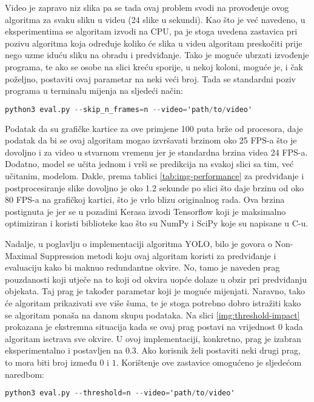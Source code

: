 Video je zapravo niz slika pa se tada ovaj problem svodi na provođenje ovog algoritma za svaku sliku u videu (24 slike u sekundi). Kao što je već navedeno, u eksperimentima se algoritam izvodi na CPU, pa je stoga uvedena zastavica pri pozivu algoritma koja određuje koliko će slika u videu algoritam preskočiti prije nego uzme iduću sliku na obradu i predviđanje. Tako je moguće ubrzati izvođenje programa, te ako se osobe na slici kreću sporije, u nekoj koloni, moguće je, i čak poželjno, postaviti ovaj parametar na neki veći broj. Tada se standardni poziv programa u terminalu mijenja na sljedeći način:
\begin{center}
\begin{lstlisting}[language=Awk, caption=Poziv programa sa opcijom preskakanja zadanog broja (n) slika u videu]
python3 eval.py --skip_n_frames=n --video='path/to/video'
\end{lstlisting}
\end{center}

Podatak da su grafičke kartice za ove primjene 100 puta brže od procesora, daje podatak da bi se ovaj algoritam mogao izvršavati brzinom oko 25 FPS-a što je dovoljno i za video u stvarnom vremenu jer je standardna brzina videa 24 FPS-a. Dodatno, model se učita jednom i vrši se predikcija na svakoj slici sa tim, već učitanim, modelom. Dakle, prema tablici \ref{tab:img-performance} za predviđanje i postprocesiranje slike dovoljno je oko 1.2 sekunde po slici što daje brzinu od oko 80 FPS-a na grafičkoj kartici, što je vrlo blizu originalnog rada. Ova brzina postignuta je jer se u pozadini Kerasa izvodi Tensorflow koji je maksimalno optimiziran i koristi biblioteke kao što su NumPy i SciPy koje su napisane u C-u. 

Nadalje, u poglavlju o implementaciji algoritma YOLO, bilo je govora o Non-Maximal Suppression metodi koju ovaj algoritam koristi za predviđanje i evaluaciju kako bi maknuo redundantne okvire. No, tamo je naveden prag pouzdanosti koji utječe na to koji od okvira uopće dolaze u obzir pri predviđanju objekata. Taj prag je također parametar koji je moguće mijenjati. Naravno, tako će algoritam prikazivati sve više šuma, te je stoga potrebno dobro istražiti kako se algoritam ponaša na danom skupu podataka. Na slici \ref{img:threshold-impact} prokazana je ekstremna situacija kada se ovaj prag postavi na vrijednost $0$ kada algoritam isctrava sve okvire. U ovoj implementaciji, konkretno, prag je izabran eksperimentalno i postavljen na 0.3. Ako korisnik želi postaviti neki drugi prag, to mora biti broj između $0$ i $1$. Korištenje ove zastavice omogućeno je sljedećom naredbom:
\begin{center}
\begin{lstlisting}[language=Awk, caption=Poziv programa sa prozvoljnim pragom pouzdanosti okvira]
python3 eval.py --threshold=n --video='path/to/video'
\end{lstlisting}
\end{center}

